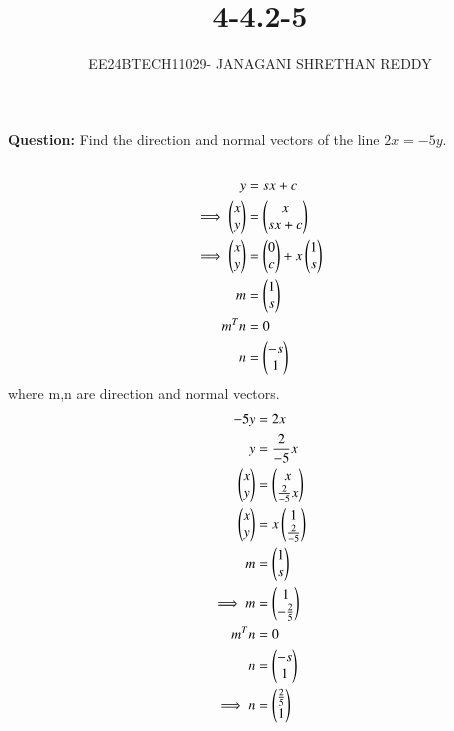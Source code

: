 \documentclass[journal]{IEEEtran}
\begin{document}
 

\vspace{3cm}

\title{4-4.2-5}
\author{EE24BTECH11029- JANAGANI SHRETHAN REDDY}
\maketitle
\bigskip
\renewcommand{\thefigure}{\theenumi}
\renewcommand{\thetable}{\theenumi}
\textbf{Question:}
Find the direction and normal vectors of the line $2x=-5y$.\\
\solution\\
\begin{align}
    y&=sx+c\\
   \implies\begin{pmatrix}x\\y\end{pmatrix}&=\begin{pmatrix}x\\sx+c\end{pmatrix}\\
    \implies\begin{pmatrix}x\\y\end{pmatrix}&=\begin{pmatrix}0\\c\end{pmatrix}+x\begin{pmatrix}1\\s\end{pmatrix}\\
    m&=\begin{pmatrix}1\\s\end{pmatrix}\\
    m^Tn&=0\\
    n&=\begin{pmatrix}-s\\1\end{pmatrix}
\end{align}
where m,n are direction and normal vectors.
\begin{align}
    -5y&=2x\\
    y&=\frac{2}{-5}x\\
    \begin{pmatrix}x\\y\end{pmatrix}&=\begin{pmatrix}x\\ \frac{2}{-5}x\end{pmatrix}\\
    \begin{pmatrix}x\\y\end{pmatrix}&=x\begin{pmatrix}1\\ \frac{2}{-5}\end{pmatrix}\\
    m&=\begin{pmatrix}1\\s\end{pmatrix}\\
    \implies m&=\begin{pmatrix}1\\ -\frac{2}{5}\end{pmatrix}\\
    m^Tn&=0\\
    n&=\begin{pmatrix}-s\\1\end{pmatrix}\\
  \implies  n&=\begin{pmatrix}\frac{2}{5}\\1\end{pmatrix}
\end{align}
\end{document}
